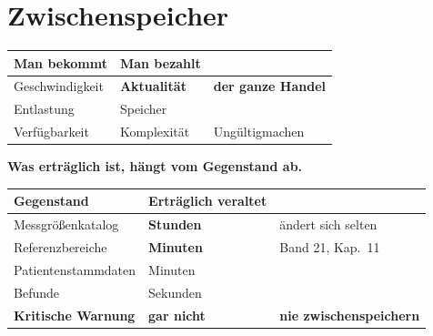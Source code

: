 \chapter{Zwischenspeicher}\label{kap:zwischenspeicher}

\begin{merksatz}
\begin{center}
\renewcommand{\arraystretch}{1.5}
\begin{tabular}{@{}P{3.0cm}P{2.2cm}P{2.8cm}@{}}
\toprule
\textbf{Man bekommt} & \textbf{Man bezahlt} & \\
\midrule
Geschwin\-digkeit & \textbf{Aktualität} & \textcolor{akzent}{\textbf{der ganze Handel}}\\
Entlastung & Speicher & \\
Verfügbarkeit & \textcolor{akzent}{Komplexität} & \textcolor{akzent}{Ungültigmachen}\\
\bottomrule
\end{tabular}
\end{center}

\begin{center}
\begin{minipage}{0.88\textwidth}
\end{minipage}
\end{center}

\textbf{Was erträglich ist, hängt vom Gegenstand ab.}

\begin{center}
{\small
\renewcommand{\arraystretch}{1.45}
\begin{tabular}{@{}P{2.8cm}P{2.4cm}P{2.6cm}@{}}
\toprule
\textbf{Gegenstand} & \textbf{Erträglich veraltet} & \\
\midrule
Messgrößen\-katalog & \textbf{Stunden} & \textcolor{gruen}{ändert sich selten}\\
Referenzbereiche & \textcolor{mittel}{\textbf{Minuten}} & \textcolor{akzent}{Band 21, Kap.~11}\\
Patienten\-stammdaten & Minuten & \\
Befunde & \textcolor{akzent}{Sekunden} & \\
\textbf{Kritische Warnung} & \textcolor{akzent}{\textbf{gar nicht}} & \textcolor{akzent}{\textbf{nie zwischenspeichern}}\\
\bottomrule
\end{tabular}}
\end{center}


\end{merksatz}
